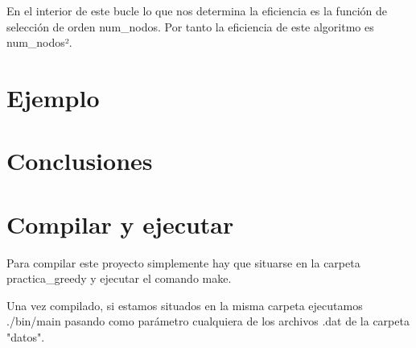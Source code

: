 \documentclass[11pt]{article}
\begin{document}
En el interior de este bucle lo que nos determina la eficiencia es la función de selección de orden num\_nodos. Por tanto la eficiencia de este algoritmo es num\_nodos².


\section*{Ejemplo}



\section*{Conclusiones}



\section*{Compilar y ejecutar}
Para compilar este proyecto simplemente hay que situarse en la carpeta practica\_greedy y ejecutar el comando make.

Una vez compilado, si estamos situados en la misma carpeta ejecutamos ./bin/main pasando como parámetro cualquiera de los archivos .dat de la carpeta "datos".
\end{document}
